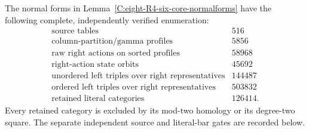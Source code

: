 \begin{proposition}
\label{C:eight-R4-six-finite-control}
The normal forms in Lemma~\ref{C:eight-R4-six-core-normalforms}
have the following complete, independently verified enumeration:
\[
\begin{array}{l|r}
\text{source tables}&516\\
\text{column-partition/gamma profiles}&5856\\
\text{raw right actions on sorted profiles}&58968\\
\text{right-action state orbits}&45692\\
\text{unordered left triples over right representatives}&144487\\
\text{ordered left triples over right representatives}&503832\\
\text{retained literal categories}&126414.
\end{array}
\]
Every retained category is excluded by its mod-two homology
or its degree-two square.  The separate independent source
and literal-bar gates are recorded below.
\end{proposition}

